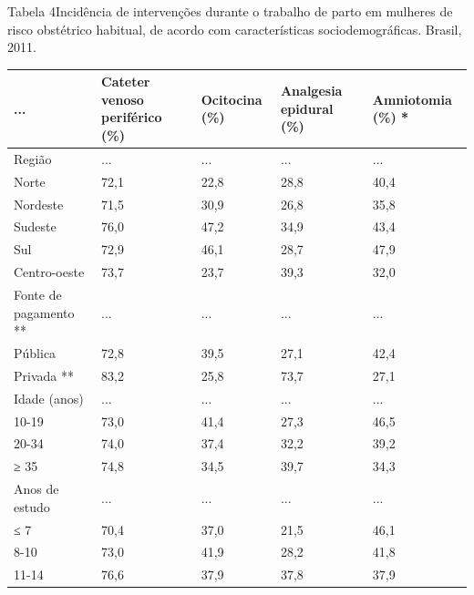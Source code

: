 \documentclass{article}
\begin{document}
Tabela 4Incidência de intervenções durante o trabalho de parto em mulheres de
risco obstétrico habitual, de acordo com características
sociodemográficas. Brasil, 2011.
\begin{table}
\begin{xtabular}{ l | l | l | l | l }
\hline... & Cateter venoso periférico (\%) & Ocitocina (\%) & Analgesia epidural (\%)
& Amniotomia (\%) *\\ \hline
Região
& ...
& ...
& ...
& ...
\\ \hline

Norte
& 72,1
& 22,8
& 28,8
& 40,4
\\ \hline

Nordeste
& 71,5
& 30,9
& 26,8
& 35,8
\\ \hline

Sudeste
& 76,0
& 47,2
& 34,9
& 43,4
\\ \hline

Sul
& 72,9
& 46,1
& 28,7
& 47,9
\\ \hline

Centro-oeste
& 73,7
& 23,7
& 39,3
& 32,0
\\ \hline

Fonte de pagamento **
& ...
& ...
& ...
& ...
\\ \hline

Pública
& 72,8
& 39,5
& 27,1
& 42,4
\\ \hline

Privada **
& 83,2
& 25,8
& 73,7
& 27,1
\\ \hline

Idade (anos)
& ...
& ...
& ...
& ...
\\ \hline

10-19
& 73,0
& 41,4
& 27,3
& 46,5
\\ \hline

20-34
& 74,0
& 37,4
& 32,2
& 39,2
\\ \hline

≥ 35
& 74,8
& 34,5
& 39,7
& 34,3
\\ \hline

Anos de estudo
& ...
& ...
& ...
& ...
\\ \hline

≤ 7
& 70,4
& 37,0
& 21,5
& 46,1
\\ \hline

8-10
& 73,0
& 41,9
& 28,2
& 41,8
\\ \hline

11-14
& 76,6
& 37,9
& 37,8
& 37,9
\\ \hline


\end{xtabular}
\end{table}
\end{document}
